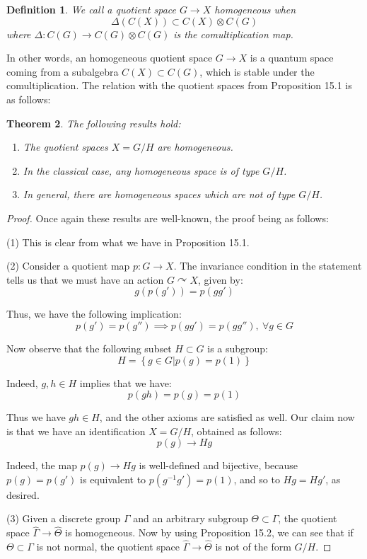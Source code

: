 \documentclass[12pt]{amsbook}
\newtheorem{theorem}{Theorem}[chapter]
\newtheorem{definition}[theorem]{Definition}
\begin{document}
\begin{definition}
We call a quotient space $G\to X$ homogeneous when
$$\Delta(C(X))\subset C(X)\otimes C(G)$$
where $\Delta:C(G)\to C(G)\otimes C(G)$ is the comultiplication map.
\end{definition}

In other words, an homogeneous quotient space $G\to X$ is a quantum space coming from a subalgebra $C(X)\subset C(G)$, which is stable under the comultiplication. The relation with the quotient spaces from Proposition 15.1 is as follows:

\begin{theorem}
The following results hold:
\begin{enumerate}
\item The quotient spaces $X=G/H$ are homogeneous.

\item In the classical case, any homogeneous space is of type $G/H$.

\item In general, there are homogeneous spaces which are not of type $G/H$.
\end{enumerate}
\end{theorem}

\begin{proof}
Once again these results are well-known, the proof being as follows:

\medskip

(1) This is clear from what we have in Proposition 15.1.

\medskip

(2) Consider a quotient map $p:G\to X$. The invariance condition in the statement tells us that we must have an action $G\curvearrowright X$, given by:
$$g(p(g'))=p(gg')$$

Thus, we have the following implication:
$$p(g')=p(g'')\implies p(gg')=p(gg''),\ \forall g\in G$$

Now observe that the following subset $H\subset G$ is a subgroup:
$$H=\left\{g\in G\Big|p(g)=p(1)\right\}$$

Indeed, $g,h\in H$ implies that we have:
$$p(gh)=p(g)=p(1)$$

Thus we have $gh\in H$, and the other axioms are satisfied as well. Our claim now is that we have an identification $X=G/H$, obtained as follows:
$$p(g)\to Hg$$

Indeed, the map $p(g)\to Hg$ is well-defined and bijective, because $p(g)=p(g')$ is equivalent to $p(g^{-1}g')=p(1)$, and so to $Hg=Hg'$, as desired. 

\medskip

(3) Given a discrete group $\Gamma$ and an arbitrary subgroup $\Theta\subset\Gamma$, the quotient space $\widehat{\Gamma}\to\widehat{\Theta}$ is homogeneous. Now by using Proposition 15.2, we can see that if $\Theta\subset\Gamma$ is not normal, the quotient space $\widehat{\Gamma}\to\widehat{\Theta}$ is not of the form $G/H$.
\end{proof}
\end{document}

